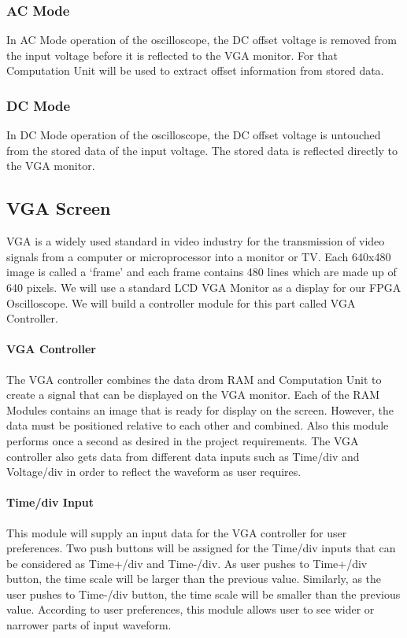 \subsubsection{AC Mode} \- \indent
	In AC Mode operation of the oscilloscope, the DC offset voltage is removed from the input voltage before it is reflected to the VGA monitor. For that Computation Unit will be used to extract offset information from stored data.

\subsubsection{DC Mode} \- \indent
	In DC Mode operation of the oscilloscope, the DC offset voltage is untouched from the stored data of the input voltage. The stored data is reflected directly to the VGA monitor. 
	

\subsection{VGA Screen} \- \indent
	VGA is a widely used standard in video industry for the transmission of video signals from a computer or microprocessor into a monitor or TV. Each 640x480 image is called a ‘frame’ and each frame contains 480 lines which are made up of 640 pixels. We will use a standard LCD VGA Monitor as a display for our FPGA Oscilloscope. We will build a controller module for this part called VGA Controller. 
	

\paragraph*{VGA Controller} \- \indent

	The VGA controller combines the data drom RAM and Computation Unit to create a signal that can be displayed on the VGA monitor. Each of the RAM Modules contains an image that is ready for display on the screen. However, the data must be positioned relative to each other and combined. Also this module performs once a second as desired in the project requirements. The VGA controller also gets data from different data inputs such as Time/div and Voltage/div in order to reflect the waveform as user requires.

\paragraph*{Time/div Input} \- \indent
	
	This module will supply an input data for the VGA controller for user preferences. Two push buttons will be assigned for the Time/div inputs that can be considered as Time+/div and Time-/div. As user pushes to Time+/div button, the time scale will be larger than the previous value. Similarly, as the user pushes to Time-/div button, the time scale will be smaller than the previous value. According to user preferences, this module allows user to see wider or narrower parts of input waveform.
	  
